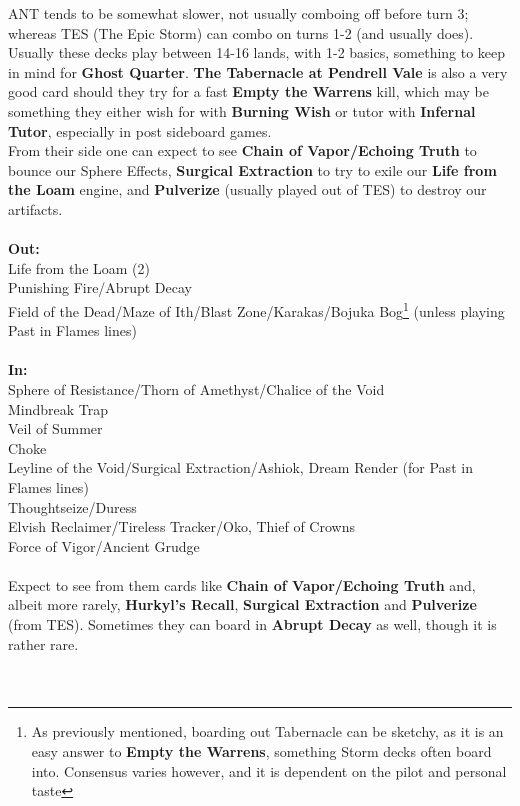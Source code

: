 \documentclass{report}
\begin{document}
ANT tends to be somewhat slower, not usually comboing off before turn 3; whereas TES (The Epic Storm) can combo on turns 1-2 (and usually does). Usually these decks play between 14-16 lands, with 1-2 basics, something to keep in mind for \textbf{Ghost Quarter}. \textbf{The Tabernacle at Pendrell Vale} is also a very good card should they try for a fast \textbf{Empty the Warrens} kill, which may be something they either wish for with \textbf{Burning Wish} or tutor with \textbf{Infernal Tutor}, especially in post sideboard games.\\
From their side one can expect to see \textbf{Chain of Vapor/Echoing Truth} to bounce our Sphere Effects, \textbf{Surgical Extraction} to try to exile our \textbf{Life from the Loam} engine, and \textbf{Pulverize} (usually played out of TES) to destroy our artifacts.\\\\
\textbf{Out:}\\
Life from the Loam (2)\\Punishing Fire/Abrupt Decay\\Field of the Dead/Maze of Ith/Blast Zone/Karakas/Bojuka Bog\footnote{As previously mentioned, boarding out Tabernacle can be sketchy, as it is an easy answer to \textbf{Empty the Warrens}, something Storm decks often board into. Consensus varies however, and it is dependent on the pilot and personal taste} (unless playing Past in Flames lines)\\\\
\textbf{In:}\\
Sphere of Resistance/Thorn of Amethyst/Chalice of the Void\\Mindbreak Trap\\Veil of Summer\\Choke\\Leyline of the Void/Surgical Extraction/Ashiok, Dream Render (for Past in Flames lines)\\Thoughtseize/Duress\\Elvish Reclaimer/Tireless Tracker/Oko, Thief of Crowns\\Force of Vigor/Ancient Grudge\\\\
Expect to see from them cards like \textbf{Chain of Vapor/Echoing Truth} and, albeit more rarely, \textbf{Hurkyl's Recall}, \textbf{Surgical Extraction} and \textbf{Pulverize} (from TES). Sometimes they can board in \textbf{Abrupt Decay} as well, though it is rather rare.\\\\\\
\end{document}
